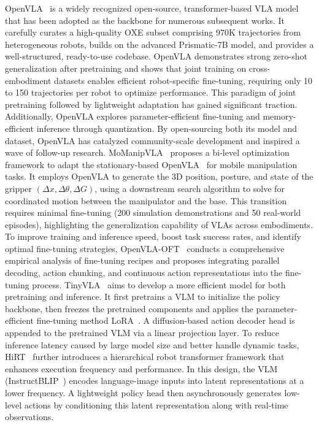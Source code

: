 \documentclass[10pt, a4paper, logo, copyright]{googledeepmind} %
\begin{document}
OpenVLA~\cite{kim2024openvla} is a widely recognized open-source, transformer-based VLA model that has been adopted as the backbone for numerous subsequent works. It carefully curates a high-quality OXE subset comprising 970K trajectories from heterogeneous robots, builds on the advanced Prismatic-7B model, and provides a well-structured, ready-to-use codebase. OpenVLA demonstrates strong zero-shot generalization after pretraining and shows that joint training on cross-embodiment datasets enables efficient robot-specific fine-tuning, requiring only 10 to 150 trajectories per robot to optimize performance. This paradigm of joint pretraining followed by lightweight adaptation has gained significant traction. Additionally, OpenVLA explores parameter-efficient fine-tuning and memory-efficient inference through quantization. By open-sourcing both its model and dataset, OpenVLA has catalyzed community-scale development and inspired a wave of follow-up research.
MoManipVLA~\cite{MoManipVLA} proposes a bi-level optimization framework to adapt the stationary-based OpenVLA~\cite{kim2024openvla} for mobile manipulation tasks. It employs OpenVLA to generate the 3D position, posture, and state of the gripper $(\Delta x, \Delta \theta, \Delta G)$, using a downstream search algorithm to solve for coordinated motion between the manipulator and the base. This transition requires minimal fine-tuning (200 simulation demonstrations and 50 real-world episodes), highlighting the generalization capability of VLAs across embodiments. To improve training and inference speed, boost task success rates, and identify optimal fine-tuning strategies, OpenVLA-OFT~\cite{openvla-oft} conducts a comprehensive empirical analysis of fine-tuning recipes and proposes integrating parallel decoding, action chunking, and continuous action representations into the fine-tuning process.
TinyVLA~\cite{wen2025tinyvlafastdataefficientvisionlanguageaction} aims to develop a more efficient model for both pretraining and inference. It first pretrains a VLM to initialize the policy backbone, then freezes the pretrained components and applies the parameter-efficient fine-tuning method LoRA~\cite{hu2022lora}. A diffusion-based action decoder head is appended to the pretrained VLM via a linear projection layer.
To reduce inference latency caused by large model size and better handle dynamic tasks, HiRT~\cite{zhang2024hirt} further introduces a hierarchical robot transformer framework that enhances execution frequency and performance. In this design, the VLM (InstructBLIP~\cite{dai2023instructblipgeneralpurposevisionlanguagemodels}) encodes language-image inputs into latent representations at a lower frequency. A lightweight policy head then asynchronously generates low-level actions by conditioning this latent representation along with real-time observations.
\end{document}
